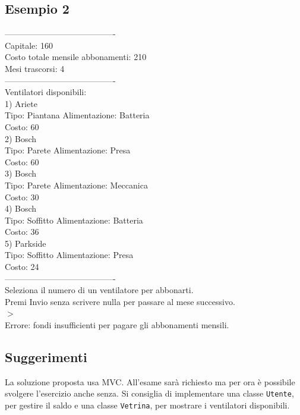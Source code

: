\documentclass{article}
\begin{document}
\subsection*{Esempio 2}
\begin{tcolorbox}
---------------------------------------- \\
Capitale: 160 \\
Costo totale mensile abbonamenti: 210 \\
Mesi trascorsi: 4 \\
---------------------------------------- \\
Ventilatori disponibili: \\
1) Ariete \\
Tipo: Piantana Alimentazione: Batteria \\
Costo: 60 \\
2) Bosch \\
Tipo: Parete Alimentazione: Presa \\
Costo: 60 \\
3) Bosch \\
Tipo: Parete Alimentazione: Meccanica \\
Costo: 30 \\
4) Bosch \\
Tipo: Soffitto Alimentazione: Batteria \\ 
Costo: 36 \\
5) Parkside \\
Tipo: Soffitto Alimentazione: Presa \\
Costo: 24 \\
---------------------------------------- \\
Seleziona il numero di un ventilatore per abbonarti. \\
Premi Invio senza scrivere nulla per passare al mese successivo. \\
\(>\) \\
Errore: fondi insufficienti per pagare gli abbonamenti mensili.\\
\end{tcolorbox}

\subsection*{Suggerimenti}
La soluzione proposta usa MVC. All'esame sarà richiesto ma per ora è possibile svolgere l'esercizio anche senza.
\newline
Si consiglia di implementare una classe \texttt{Utente}, per gestire il saldo e una classe \texttt{Vetrina}, per mostrare i ventilatori disponibili.
\end{document}
